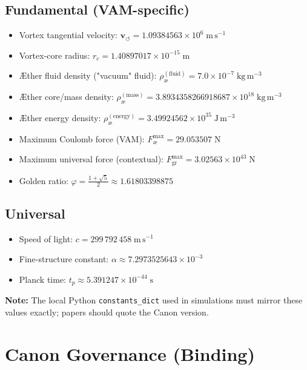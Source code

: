 \documentclass[11pt, a4paper]{article}
\begin{document}
\subsection{Fundamental (VAM-specific)}
\begin{itemize}
    \item Vortex tangential velocity: $\mathbf{v}_{\scriptscriptstyle\boldsymbol{\circlearrowleft}} = 1.09384563 \times 10^{6}\;\mathrm{m}\,\mathrm{s}^{-1}$
    \item Vortex-core radius: $r_c = 1.40897017 \times 10^{-15}\;\mathrm{m}$
    \item Æther fluid density ("vacuum" fluid): $\rho_{\text{\ae}}^{(\text{fluid})} = 7.0 \times 10^{-7}\;\mathrm{kg}\,\mathrm{m}^{-3}$
    \item Æther core/mass density: $\rho_{\text{\ae}}^{(\text{mass})} = 3.8934358266918687 \times 10^{18}\;\mathrm{kg}\,\mathrm{m}^{-3}$
    \item Æther energy density: $\rho_{\text{\ae}}^{(\text{energy})} = 3.49924562 \times 10^{35}\;\mathrm{J}\,\mathrm{m}^{-3}$
    \item Maximum Coulomb force (VAM): $F_{\text{\ae}}^{\max} = 29.053507\;\mathrm{N}$
    \item Maximum universal force (contextual): $F_{\text{gr}}^{\max} = 3.02563 \times 10^{43}\;\mathrm{N}$
    \item Golden ratio: $\varphi = \frac{1+\sqrt{5}}{2} \approx 1.61803398875$
\end{itemize}

\subsection{Universal}
\begin{itemize}
    \item Speed of light: $c = 299\,792\,458\;\mathrm{m}\,\mathrm{s}^{-1}$
    \item Fine-structure constant: $\alpha \approx 7.2973525643 \times 10^{-3}$
    \item Planck time: $t_p \approx 5.391247 \times 10^{-44}\;\mathrm{s}$
\end{itemize}

\textbf{Note:} The local Python \texttt{constants\_dict} used in simulations must mirror these values exactly; papers should quote the Canon version.

    \section*{Canon Governance (Binding)}
\end{document}
